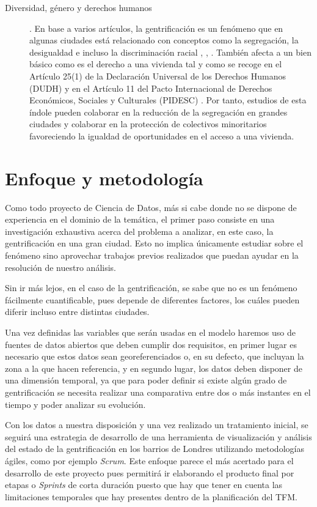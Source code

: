 \documentclass[12pt,a4paper,twoside]{book}
\begin{document}
\begin{description}
    \item[Diversidad, género y derechos humanos]. En base a varios artículos, la gentrificación es un fenómeno que en algunas ciudades está relacionado con conceptos como la segregación, la desigualdad e incluso la discriminación racial \cite{feder_gentrification_2020}, \cite{operti_frontiers_2022}, \cite{turner_causes_2022}. También afecta a un bien básico como es el derecho a una vivienda tal y como se recoge en el Artículo 25(1) de la Declaración Universal de los Derechos Humanos (DUDH) \cite{nations_declaracion_1948} y en el Artículo 11 del Pacto Internacional de Derechos Económicos, Sociales y Culturales (PIDESC) \cite{nacionesunidas_pacto_1966}. Por tanto, estudios de esta índole pueden colaborar en la reducción de la segregación en grandes ciudades y colaborar en la protección de colectivos minoritarios favoreciendo la igualdad de oportunidades en el acceso a una vivienda.
\end{description}

\section{Enfoque y metodología}

Como todo proyecto de Ciencia de Datos, más si cabe donde no se dispone de experiencia en el dominio de la temática, el primer paso consiste en una investigación exhaustiva acerca del problema a analizar, en este caso, la gentrificación en una gran ciudad. Esto no implica únicamente estudiar sobre el fenómeno sino aprovechar trabajos previos realizados que puedan ayudar en la resolución de nuestro análisis.

Sin ir más lejos, en el caso de la gentrificación, se sabe que no es un fenómeno fácilmente cuantificable, pues depende de diferentes factores, los cuáles pueden diferir incluso entre distintas ciudades.

Una vez definidas las variables que serán usadas en el modelo haremos uso de fuentes de datos abiertos que deben cumplir dos requisitos, en primer lugar es necesario que estos datos sean georeferenciados o, en su defecto, que incluyan la zona a la que hacen referencia, y en segundo lugar, los datos deben disponer de una dimensión temporal, ya que para poder definir si existe algún grado de gentrificación se necesita realizar una comparativa entre dos o más instantes en el tiempo y poder analizar su evolución.

Con los datos a nuestra disposición y una vez realizado un tratamiento inicial, se seguirá una estrategia de desarrollo de una herramienta de visualización y análisis del estado de la gentrificación en los barrios de Londres utilizando metodologías ágiles, como por ejemplo \textit{Scrum}. Este enfoque parece el más acertado para el desarrollo de este proyecto pues permitirá ir elaborando el producto final por etapas o \textit{Sprints} de corta duración puesto que hay que tener en cuenta las limitaciones temporales que hay presentes dentro de la planificación del TFM.
\end{document}
